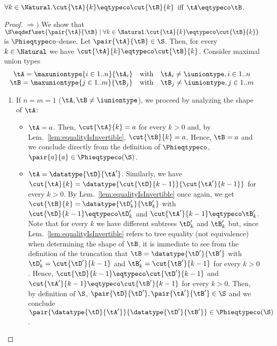 \begin{lemma}
\label{lem:cutEquivalenceCo}
$\forall k \in \Natural.\cut{\tA}{k} \eqtypeco \cut{\tB}{k}$ iff $\tA \eqtypeco \tB$.
\end{lemma}

\begin{proof}
$\Rightarrow)$ We show that $\S \eqdef \set{\pair{\tA}{\tB} \mathrel| \forall
k \in \Natural. \cut{\tA}{k} \eqtypeco \cut{\tB}{k}}$ is $\Phieqtypeco$-dense.
Let $\pair{\tA}{\tB} \in \S$. Then, for every $k \in \Natural$ we have
$\cut{\tA}{k} \eqtypeco \cut{\tB}{k}$. Consider maximal union types $$
\begin{array}{r@{\quad\text{with}\quad}l}
\tA = \maxuniontype{i \in 1..n}{\tA_i} & \tA_i \neq \iuniontype, i \in 1..n \\
\tB = \maxuniontype{j \in 1..m}{\tB_j} & \tB_j \neq \iuniontype, j \in 1..m
\end{array} $$
\begin{enumerate}
  \item If $n = m = 1$ (\ie $\tA, \tB \neq \iuniontype$), we proceed by
  analyzing the shape of $\tA$:
  \begin{itemize}
    \item $\tA = a$. Then, $\cut{\tA}{k} = a$ for every $k > 0$ and, by
    Lem.~\ref{lem:equalityIsInvertible}, $\cut{\tB}{k} = a$. Hence, $\tB = a$
    and we conclude directly from the definition of $\Phieqtypeco$,
    $\pair{a}{a} \in \Phieqtypeco\!\left(\S\right)$.
    
    \item $\tA = \datatype{\tD}{\tA'}$. Similarly, we have $\cut{\tA}{k} =
    \datatype{\cut{\tD}{k-1}}{\cut{\tA'}{k-1}}$ for every $k > 0$. By
    Lem.~\ref{lem:equalityIsInvertible} once again, we get $\cut{\tB}{k} =
    \datatype{\tD'_k}{\tB'_k}$ with $\cut{\tD}{k-1} \eqtypeco \tD'_k$ and
    $\cut{\tA'}{k-1} \eqtypeco \tB'_k$. Note that for every $k$ we have
    different subtrees $\tD'_k$ and $\tB'_k$ but, since
    Lem.~\ref{lem:equalityIsInvertible} refers to tree equality (not
    equivalence) when determining the shape of $\tB$, it is immediate to see
    from the definition of the truncation that $\tB = \datatype{\tD'}{\tB'}$
    with $\tD'_k = \cut{\tD'}{k-1}$ and $\tB'_k = \cut{\tB'}{k-1}$ for every
    $k > 0$. Hence, $\cut{\tD}{k-1} \eqtypeco \cut{\tD'}{k-1}$ and
    $\cut{\tA'}{k-1} \eqtypeco \cut{\tB'}{k-1}$ for every $k > 0$. Then, by
    definition of $\S$, $\pair{\tD}{\tD'}, \pair{\tA'}{\tB'} \in \S$ and we
    conclude $\pair{\datatype{\tD}{\tA'}}{\datatype{\tD'}{\tB'}} \in
    \Phieqtypeco\!\left(\S\right)$.
    

\end{itemize}
\end{enumerate}
\end{proof}
